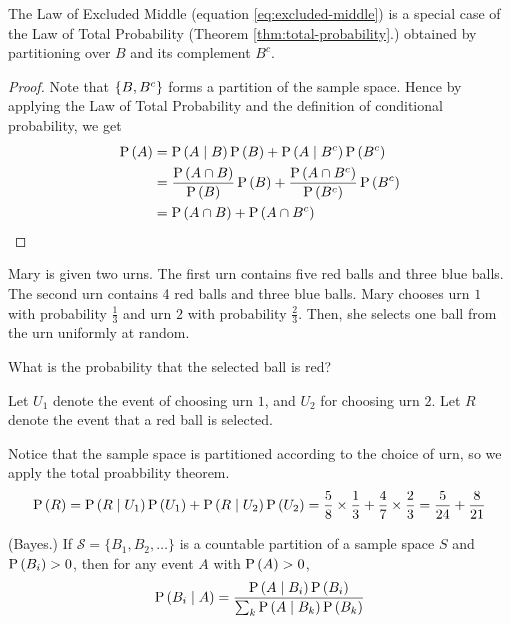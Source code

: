 \documentclass[11pt]{article}
\begin{document}
\begin{rem}
    The Law of Excluded Middle (equation \ref{eq:excluded-middle}) is a special
    case of the Law of Total Probability (Theorem \ref{thm:total-probability}.)
    obtained by partitioning over $B$ and its complement $B^c$.
\end{rem}

\begin{proof}
    Note that $\setof{B, B^c}$ forms a partition of the sample space. Hence by
    applying the Law of Total Probability and the definition of conditional
    probability, we get
    \begin{align*}
        \P{A}
        &= \P{A \given B} \P{B} + \P{A \given B^c} \P{B^c} \\
        &= \frac{\P{A \intersn B}}{\P{B}} \P{B}
            + \frac{\P{A \intersn B^c}}{\P{B^c}} \P{B^c} \\
        &= \P{A \intersn B} + \P{A \intersn B^c}
    \end{align*}
\end{proof}

\begin{eg}
    \label{eg:marys-urns}
    Mary is given two urns. The first urn contains five red balls and three
    blue balls. The second urn contains 4 red balls and three blue balls. Mary
    chooses urn $1$ with probability $\frac{1}{3}$ and urn $2$ with probability
    $\frac{2}{3}$. Then, she selects one ball from the urn uniformly at random.

    What is the probability that the selected ball is red?
\end{eg}

\begin{solution}
    Let $U_1$ denote the event of choosing urn $1$, and $U_2$ for choosing urn
    $2$. Let $R$ denote the event that a red ball is selected.

    Notice that the sample space is partitioned according to the choice of urn,
    so we apply the total proabbility theorem.
    \begin{equation*}
        \P{R}
        = \P{R \given U_1}\P{U_1} + \P{R \given U_2}\P{U_2}
        = \frac{5}{8} \times \frac{1}{3} + \frac{4}{7} \times \frac{2}{3}
        = \frac{5}{24} + \frac{8}{21}
    \end{equation*}
\end{solution}

\begin{thm}{(Bayes.)}
    \label{thm:bayes}
    If $\mathcal{S} = \{B_1, B_2, \ldots\}$ is a countable partition of a
    sample space $S$ and $\P{B_i} > 0$, then for any event $A$ with
    $\P{A} > 0$,
    \begin{equation}
        \label{eq:bayes}
        \P{B_i \given A}
        = \frac{\P{A \given B_i}\P{B_i}}{\sum_{k} \P{A \given B_k} \P{B_k}}
    \end{equation}
\end{thm}
\end{document}
